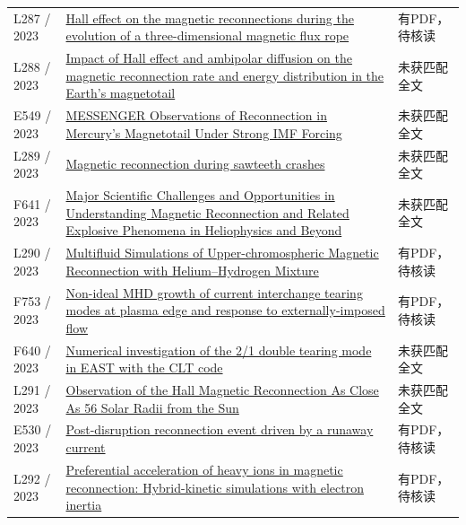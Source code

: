 \begin{longtable}{P{24mm}P{97mm}P{27mm}}
L287 / 2023 & \href{https://doi.org/10.1088/1402-4896/acd3bb}{Hall effect on the magnetic reconnections during the evolution of a three-dimensional magnetic flux rope} & 有PDF，待核读\\

L288 / 2023 & \href{https://noesis.uis.edu.co/handle/20.500.14071/12490}{Impact of Hall effect and ambipolar diffusion on the magnetic reconnection rate and energy distribution in the Earth’s magnetotail} & 未获匹配全文\\

E549 / 2023 & \href{https://doi.org/10.1029/2022ja031134}{MESSENGER Observations of Reconnection in Mercury's Magnetotail Under Strong IMF Forcing} & 未获匹配全文\\

L289 / 2023 & \href{https://doi.org/10.1063/5.0169243}{Magnetic reconnection during sawteeth crashes} & 未获匹配全文\\

F641 / 2023 & \href{https://doi.org/10.3847/25c2cfeb.e22a8d1f}{Major Scientific Challenges and Opportunities in Understanding Magnetic Reconnection and Related Explosive Phenomena in Heliophysics and Beyond} & 未获匹配全文\\

L290 / 2023 & \href{https://doi.org/10.3847/1538-4357/acbfb1}{Multifluid Simulations of Upper-chromospheric Magnetic Reconnection with Helium–Hydrogen Mixture} & 有PDF，待核读\\

F753 / 2023 & \href{https://doi.org/10.1063/5.0106785}{Non-ideal MHD growth of current interchange tearing modes at plasma edge and response to externally-imposed flow} & 有PDF，待核读\\

F640 / 2023 & \href{https://doi.org/10.1063/5.0159182}{Numerical investigation of the 2/1 double tearing mode in EAST with the CLT code} & 未获匹配全文\\

L291 / 2023 & \href{https://doi.org/10.3847/1538-4357/acbdf6}{Observation of the Hall Magnetic Reconnection As Close As 56 Solar Radii from the Sun} & 未获匹配全文\\

E530 / 2023 & \href{https://doi.org/10.1063/5.0174167}{Post-disruption reconnection event driven by a runaway current} & 有PDF，待核读\\

L292 / 2023 & \href{https://doi.org/10.48550/arxiv.2307.13268}{Preferential acceleration of heavy ions in magnetic reconnection: Hybrid-kinetic simulations with electron inertia} & 有PDF，待核读\\


\end{longtable}
